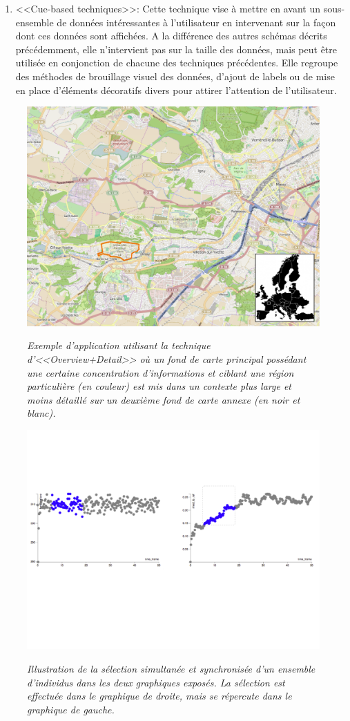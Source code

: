 \begin{enumerate}
    \item <<Cue-based techniques>>: Cette technique vise à mettre en avant un sous-ensemble de données intéressantes à l'utilisateur en intervenant sur la façon dont ces données sont affichées. A la différence des autres schémas décrits précédemment, elle n'intervient pas sur la taille des données, mais peut être utilisée en conjonction de chacune des techniques précédentes. Elle regroupe des méthodes de brouillage visuel des données, d'ajout de labels ou de mise en place d'éléments décoratifs divers pour attirer l'attention de l'utilisateur.
\end{enumerate}

\begin{figure}
  \centering
  {\includegraphics[width=.65\linewidth]{./figures/ch2/ch2_overview+detail}}
    \caption{{\it Exemple d'application utilisant la technique d'<<Overview+Detail>> où un fond de carte principal possédant une certaine concentration d'informations et ciblant une région particulière (en couleur) est mis dans un contexte plus large et moins détaillé sur un deuxième fond de carte annexe (en noir et blanc).}}
  \label{Fig:overview+detail}
  \hspace{0.3cm}
\end{figure}

\begin{figure}
  \centering
  {\includegraphics[width=.75\linewidth]{./figures/ch2/ch2_focus+context}}
    \caption{{\it Illustration de la sélection simultanée et synchronisée d'un ensemble d'individus dans les deux graphiques exposés. La sélection est effectuée dans le graphique de droite, mais se répercute dans le graphique de gauche.}}
  \label{Fig:focus+context}
  \hspace{0.3cm}
\end{figure}


